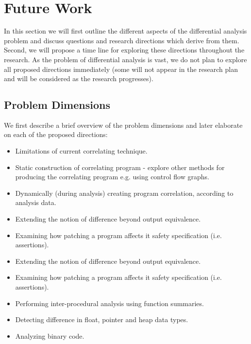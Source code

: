 \section{Future Work}

In this section we will first outline the different aspects of the differential analysis problem and discuss questions and research directions which derive from them. Second, we will propose a time line for exploring these directions throughout the research. As the problem of differential analysis is vast, we do not plan to explore all proposed directions immediately (some will not appear in the research plan and will be considered as the research progresses).

\subsection{Problem Dimensions}

We first describe a brief overview of the problem dimensions and later elaborate on each of the proposed directions:

\begin{itemize}
\item Limitations of current correlating technique.
\item Static construction of correlating program - explore other methods for producing the correlating program e.g. using control flow graphs.
\item Dynamically (during analysis) creating program correlation, according to analysis data.
\end{itemize}

\begin{itemize}
\item Extending the notion of difference beyond output equivalence.
\item Examining how patching a program affects it safety specification (i.e. assertions).
\end{itemize}

\begin{itemize}
\item Extending the notion of difference beyond output equivalence.
\item Examining how patching a program affects it safety specification (i.e. assertions).
\end{itemize}

\begin{itemize}
\item Performing inter-procedural analysis using function summaries.
\item Detecting difference in float, pointer and heap data types.
\item Analyzing binary code.
\end{itemize}

